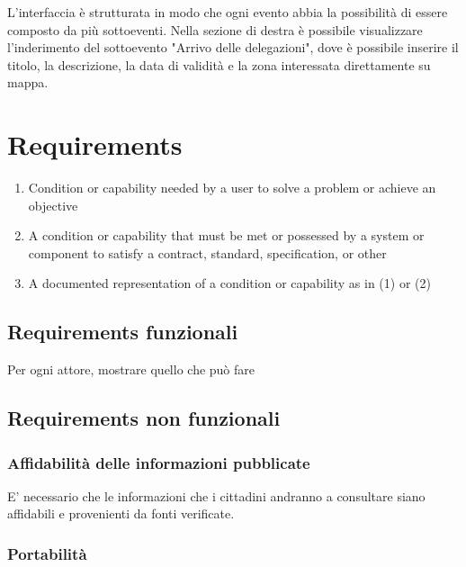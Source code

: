 \documentclass{article}
\begin{document}
L'interfaccia è strutturata in modo che ogni evento abbia la possibilità di essere composto da più sottoeventi. Nella sezione di destra è possibile visualizzare l'inderimento del sottoevento "Arrivo delle delegazioni", dove è possibile inserire il titolo, la descrizione, la data di validità e la zona interessata direttamente su mappa.\\

\clearpage

\section{Requirements}
\begin{enumerate}
    \item Condition or capability needed by a user to solve a problem or achieve an objective
    \item A condition or capability that must be met or possessed by a system or component to satisfy a contract, standard, specification, or other
    \item A documented representation of a condition or capability as in (1) or (2)
\end{enumerate}

\subsection{Requirements funzionali}

Per ogni attore, mostrare quello che può fare

\clearpage

\subsection{Requirements non funzionali}

\subsubsection{Affidabilità delle informazioni pubblicate}

E' necessario che le informazioni che i cittadini andranno a consultare siano affidabili e provenienti da fonti verificate.\\

\subsubsection{Portabilità}
\end{document}
